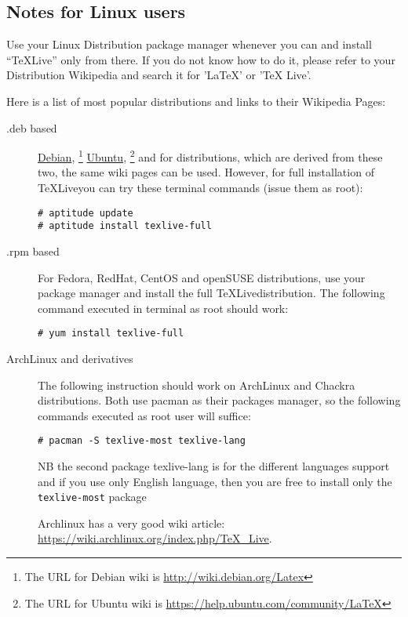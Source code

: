 \documentclass[a4paper]{article}
\newcommand{\TeXLive}{\TeX Live}
\begin{document}
\subsection{Notes for Linux users}

Use your Linux Distribution package manager whenever you can and install
``\TeXLive'' only from there. If you do not know how to do it, please refer to
your Distribution Wikipedia and search it for 'LaTeX' or 'TeX Live'.

Here is a list of most popular distributions and links to their Wikipedia Pages:

\begin{description}
    \item[.deb based] 
        \href{http://wiki.debian.org/Latex}{Debian},
        \footnote{The URL for Debian wiki is \url{http://wiki.debian.org/Latex}}
        \href{https://help.ubuntu.com/community/LaTeX}{Ubuntu},
        \footnote{The URL for Ubuntu wiki is
        \url{https://help.ubuntu.com/community/LaTeX}}
        and for distributions, which are derived from these two, the same wiki
        pages can be used. However, for full installation of \TeXLive you can try
        these terminal commands (issue them as root):
\begin{verbatim}
# aptitude update
# aptitude install texlive-full
\end{verbatim}

    \item[.rpm based]
        For Fedora, RedHat, CentOS and openSUSE distributions, use your package
        manager and install the full \TeXLive distribution. The following
        command executed in terminal as root should work:
\begin{verbatim}
# yum install texlive-full
\end{verbatim}

    \item[ArchLinux and derivatives]
        The following instruction should work on ArchLinux and Chackra
        distributions. Both use pacman as their packages manager, so the
        following commands executed as root user will suffice:
\begin{verbatim}
# pacman -S texlive-most texlive-lang
\end{verbatim}
        NB the second package texlive-lang is for the different languages
        support and if you use only English language, then you are free to
        install only the \verb|texlive-most| package

        Archlinux has a very good wiki article:
        \url{https://wiki.archlinux.org/index.php/TeX_Live}.
        

\end{description}
\end{document}
